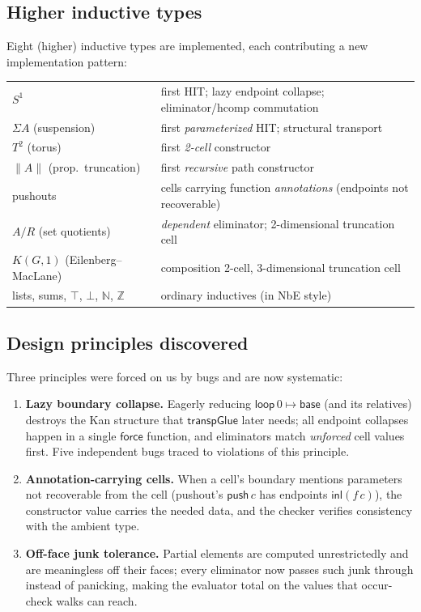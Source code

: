 \documentclass[11pt]{article}
\newcommand{\Z}{\mathbb{Z}}
\newcommand{\N}{\mathbb{N}}
\newcommand{\op}[1]{\ensuremath{\mathsf{#1}}}
\begin{document}
\subsection{Higher inductive types}
Eight (higher) inductive types are implemented, each contributing a new
implementation pattern:
\begin{center}
\begin{tabular}{ll}
$S^1$ & first HIT; lazy endpoint collapse; eliminator/hcomp commutation\\
$\Sigma A$ (suspension) & first \emph{parameterized} HIT; structural transport\\
$T^2$ (torus) & first \emph{2-cell} constructor\\
$\lVert A\rVert$ (prop.\ truncation) & first \emph{recursive} path constructor\\
pushouts & cells carrying function \emph{annotations} (endpoints not recoverable)\\
$A/R$ (set quotients) & \emph{dependent} eliminator; 2-dimensional truncation cell\\
$K(G,1)$ (Eilenberg--MacLane) & composition 2-cell, 3-dimensional truncation cell\\
lists, sums, $\top$, $\bot$, $\N$, $\Z$ & ordinary inductives (in NbE style)
\end{tabular}
\end{center}

\subsection{Design principles discovered}
Three principles were forced on us by bugs and are now systematic:
\begin{enumerate}[leftmargin=1.7em]
\item \textbf{Lazy boundary collapse.}  Eagerly reducing
$\op{loop}\,0\mapsto\op{base}$ (and its relatives) destroys the Kan
structure that $\op{transpGlue}$ later needs; all endpoint collapses
happen in a single \op{force} function, and eliminators match
\emph{unforced} cell values first.  Five independent bugs traced to
violations of this principle.
\item \textbf{Annotation-carrying cells.}  When a cell's boundary
mentions parameters not recoverable from the cell (pushout's
$\op{push}\,c$ has endpoints $\op{inl}(f\,c)$), the constructor value
carries the needed data, and the checker verifies consistency with the
ambient type.
\item \textbf{Off-face junk tolerance.}  Partial elements are computed
unrestrictedly and are meaningless off their faces; every eliminator now
passes such junk through instead of panicking, making the evaluator total
on the values that occur-check walks can reach.
\end{enumerate}
\end{document}
